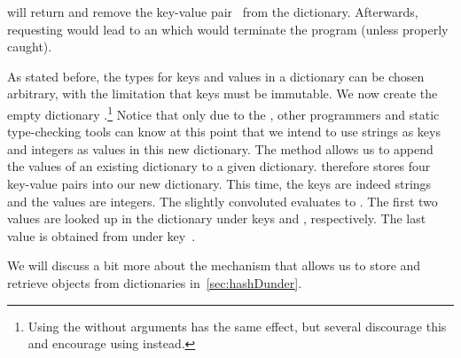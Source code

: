  will return  and remove the key-value pair~ from the dictionary.
Afterwards, requesting  would lead to an  which would terminate the program (unless properly caught).%
%
\begin{sloppypar}%
As stated before, the types for keys and values in a dictionary can be chosen arbitrary, with the limitation that keys must be immutable.
We now create the empty dictionary \pythonIdx{\textbraceleft\textbraceright}.\footnote{%
Using the  without arguments has the same effect, but several  discourage this and encourage using \pythonil{\{\}}\pythonIdx{\textbraceleft\textbraceright} instead.%
}
Notice that only due to the  , other programmers and static type-checking tools can know at this point that we intend to use strings as keys and integers as values in this new dictionary.
The  method allows us to append the values of an existing dictionary to a given dictionary.
 therefore stores four key-value pairs into our new dictionary.
This time, the keys are indeed strings and the values are integers.
The slightly convoluted   evaluates to .
The first two values are looked up in the  dictionary under keys  and , respectively.
The last value is obtained from  under key~.%
\end{sloppypar}%
%
We will discuss a bit more about the mechanism that allows us to store and retrieve objects from dictionaries in~\cref{sec:hashDunder}.%
%
\FloatBarrier%
\endhsection%
%
